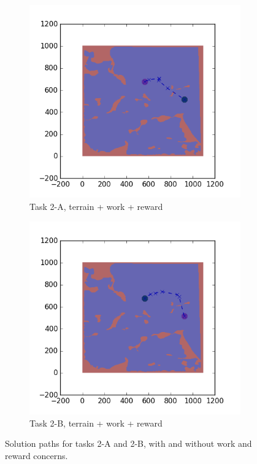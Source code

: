 \documentclass{tamuccthesis}
\begin{document}
\begin{figure}
  \begin{subfigure}[b]{0.4\textwidth}
        \centering
        \includegraphics[width=\textwidth,trim={4cm 3cm 2cm 3cm},clip]{EXP3RG_PathBa_-1_-1_-1_-1.png}
        \caption[]{{\small Task 2-A, terrain + work + reward}}    
        \label{fig:Path_2-A_terrain_work_reward}
    \end{subfigure}
    \hfill
    \begin{subfigure}[b]{0.4\textwidth}  
        \centering 
        \includegraphics[width=\textwidth,trim={4cm 3cm 2cm 3cm},clip]{EXP3RG_PathBb_-1_-1_-1_-1.png}
        \caption[]{{\small Task 2-B, terrain + work + reward}}   
        \label{fig:Path_2-B_terrain_work_reward}
    \end{subfigure}

    \caption[]{\small Solution paths for tasks 2-A and 2-B, with and without work and reward concerns.} 
    \label{fig:Paths_2-A_2-B}
\end{figure}
\end{document}
